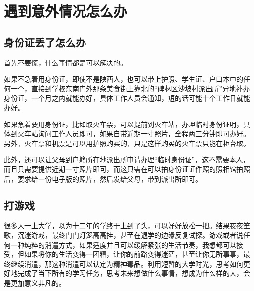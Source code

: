 \section{遇到意外情况怎么办}
\subsection{身份证丢了怎么办}
首先不要慌，什么事情都是可以解决的。\par
如果不急着用身份证，即使不是陕西人，也可以带上护照、学生证、户口本中的任何一个，直接到学校东南门外那条美食街上靠北的“碑林区沙坡村派出所”异地补办身份证，一个月之内就能办好，具体工作人员会通知，短的话可能十个工作日就能办好。\par
如果急着要用身份证，比如取火车票，可以提前到火车站，办理临时身份证明，具体到火车站询问工作人员即可，如果自带近期一寸照片，全程两三分钟即可办好。另外，火车票和机票是可以用护照购买的，只是这样购买的火车票只能在柜台取。\par
此外，还可以让父母到户籍所在地派出所申请办理“临时身份证”，这不需要本人，而且只需要提供近期一寸照片即可，而这只需在可以拍身份证证件照的照相馆拍照后，要求给一份电子版的照片，然后发给父母，带到派出所即可。
\subsection{打游戏}
很多人一上大学，以为十二年的学终于上到了头，可以好好放松一把。结果夜夜笙歌，沉迷游戏，最终门门灯笼高高挂，甚至在退学的边缘反复试探。游戏或者说任何一种纯粹的消遣方式，如果适度并且可以缓解紧张的生活节奏，我想都可以接受，但如果将你的生活变得一团糟，让你的前路变得迷茫，甚至让你无所事事，最终继续消遣，那这种消遣可以认定为精神毒品。利用短暂的大学时光，思考如何更好地完成了当下所有的学习任务，思考未来想做什么事情，想成为什么样的人，会是更加意义非凡的。
